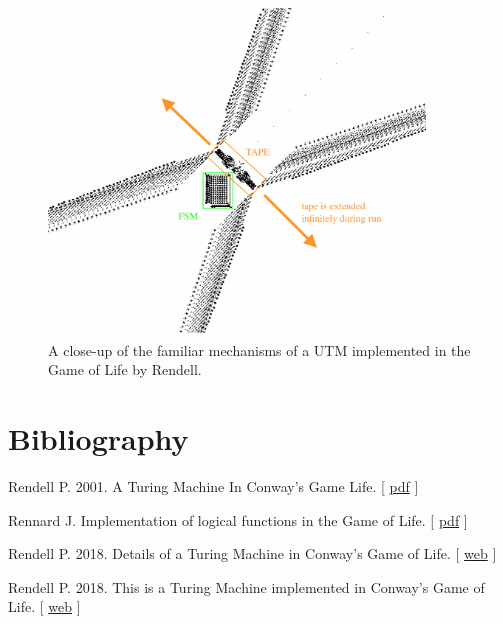 \documentclass{article}
\begin{document}
\begin{figure}[h]
\centering
\includegraphics[width=10cm,keepaspectratio]{images/URTM-zoom.png}
\captionsetup{labelformat=empty} \caption{A close-up of the familiar mechanisms of a UTM implemented in the Game of Life by Rendell.}
\end{figure}




\section*{Bibliography}


\noindent 
  Rendell P. 2001. A Turing Machine In Conway's Game Life. [
\href{https://www.ics.uci.edu/~welling/teaching/271fall09/Turing-Machine-Life.pdf}{pdf}
]
  

\vspace*{0.2cm}


\noindent 
  Rennard J. Implementation of logical functions in the Game of Life. [
\href{http://www.rennard.org/alife/CollisionBasedRennard.pdf}{pdf}
]
  

\vspace*{0.2cm}


\noindent 
  Rendell P. 2018. Details of a Turing Machine in Conway's Game of Life. [
\href{http://rendell-attic.org/gol/tmdetails.htm}{web}
]
  

\vspace*{0.2cm}


\noindent 
  Rendell P. 2018. This is a Turing Machine implemented in Conway's Game of Life. [
\href{http://rendell-attic.org/gol/tm.htm}{web}
]
  

\vspace*{0.2cm}
\end{document}
